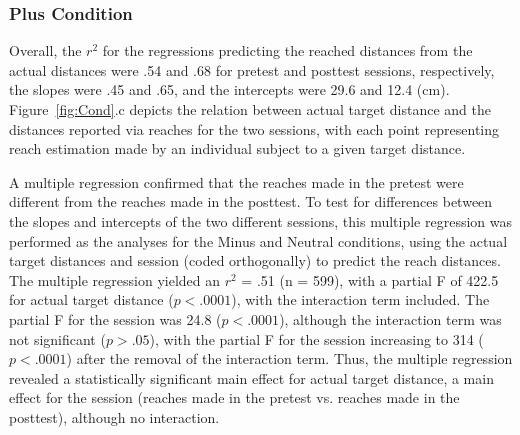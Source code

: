 \subsubsection{Plus Condition}

Overall, the $r^2$ for the regressions predicting the reached distances from the actual distances were .54 and .68 for pretest and posttest sessions, respectively, the slopes were .45 and .65, and the intercepts were 29.6 and 12.4 (cm). Figure~\ref{fig:Cond}.c depicts the relation between actual target distance and the distances reported via reaches for the two sessions, with each point representing reach estimation made by an individual subject to a given target distance.

A multiple regression confirmed that the reaches made in the pretest were different from the reaches made in the posttest. To test for differences between the slopes and intercepts of the two different sessions, this multiple regression was performed as the analyses for the Minus and Neutral conditions, using the actual target distances and session (coded orthogonally) to predict the reach distances. The multiple regression yielded an $r^2$ = .51 (n = 599), with a partial F of 422.5 for actual target distance ($p < .0001$), with the interaction term included. The partial F for the session was 24.8 ($p < .0001$), although the interaction term was not significant ($p > .05$), with the partial F for the session increasing to 314 ($p < .0001$) after the removal of the interaction term. Thus, the multiple regression revealed a statistically significant main effect for actual target distance, a main effect for the session (reaches made in the pretest vs. reaches made in the posttest), although no interaction.

